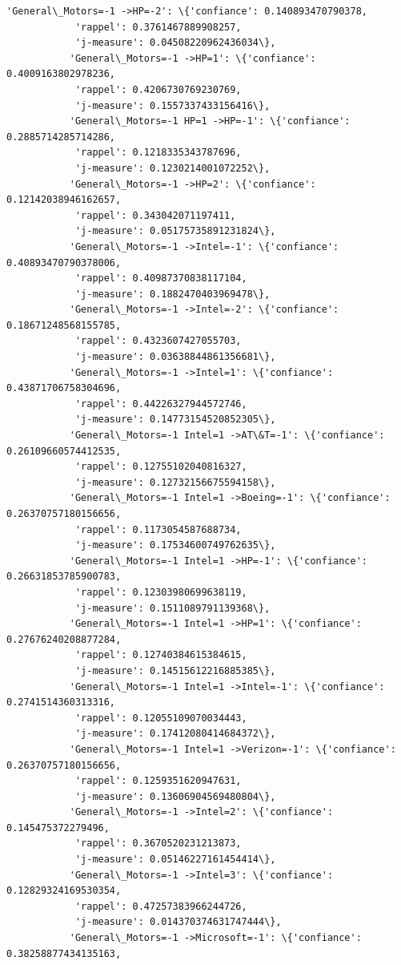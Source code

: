 \documentclass[11pt]{article}
\begin{document}
\begin{Verbatim}[commandchars=\\\{\}]
           'General\_Motors=-1 ->HP=-2': \{'confiance': 0.140893470790378,
            'rappel': 0.3761467889908257,
            'j-measure': 0.04508220962436034\},
           'General\_Motors=-1 ->HP=1': \{'confiance': 0.4009163802978236,
            'rappel': 0.4206730769230769,
            'j-measure': 0.1557337433156416\},
           'General\_Motors=-1 HP=1 ->HP=-1': \{'confiance': 0.2885714285714286,
            'rappel': 0.1218335343787696,
            'j-measure': 0.1230214001072252\},
           'General\_Motors=-1 ->HP=2': \{'confiance': 0.12142038946162657,
            'rappel': 0.343042071197411,
            'j-measure': 0.05175735891231824\},
           'General\_Motors=-1 ->Intel=-1': \{'confiance': 0.40893470790378006,
            'rappel': 0.40987370838117104,
            'j-measure': 0.1882470403969478\},
           'General\_Motors=-1 ->Intel=-2': \{'confiance': 0.18671248568155785,
            'rappel': 0.4323607427055703,
            'j-measure': 0.03638844861356681\},
           'General\_Motors=-1 ->Intel=1': \{'confiance': 0.43871706758304696,
            'rappel': 0.44226327944572746,
            'j-measure': 0.14773154520852305\},
           'General\_Motors=-1 Intel=1 ->AT\&T=-1': \{'confiance': 0.26109660574412535,
            'rappel': 0.12755102040816327,
            'j-measure': 0.12732156675594158\},
           'General\_Motors=-1 Intel=1 ->Boeing=-1': \{'confiance': 0.26370757180156656,
            'rappel': 0.1173054587688734,
            'j-measure': 0.17534600749762635\},
           'General\_Motors=-1 Intel=1 ->HP=-1': \{'confiance': 0.26631853785900783,
            'rappel': 0.12303980699638119,
            'j-measure': 0.1511089791139368\},
           'General\_Motors=-1 Intel=1 ->HP=1': \{'confiance': 0.27676240208877284,
            'rappel': 0.12740384615384615,
            'j-measure': 0.14515612216885385\},
           'General\_Motors=-1 Intel=1 ->Intel=-1': \{'confiance': 0.2741514360313316,
            'rappel': 0.12055109070034443,
            'j-measure': 0.17412080414684372\},
           'General\_Motors=-1 Intel=1 ->Verizon=-1': \{'confiance': 0.26370757180156656,
            'rappel': 0.1259351620947631,
            'j-measure': 0.13606904569480804\},
           'General\_Motors=-1 ->Intel=2': \{'confiance': 0.145475372279496,
            'rappel': 0.3670520231213873,
            'j-measure': 0.05146227161454414\},
           'General\_Motors=-1 ->Intel=3': \{'confiance': 0.12829324169530354,
            'rappel': 0.47257383966244726,
            'j-measure': 0.014370374631747444\},
           'General\_Motors=-1 ->Microsoft=-1': \{'confiance': 0.38258877434135163,

\end{Verbatim}
\end{document}
